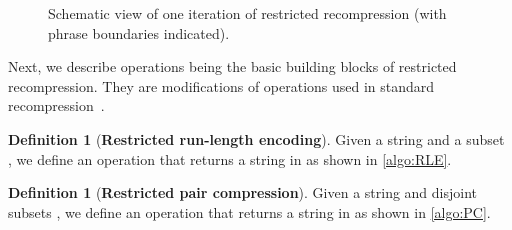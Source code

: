 \documentclass[a4paper]{article}
\theoremstyle{definition}
\newtheorem{definition}[theorem]{Definition}
\theoremstyle{remark}
\begin{document}
\begin{figure}[h]
   \caption{
  Schematic view of one iteration of restricted recompression
  (with phrase boundaries indicated).}\label{fig:schematic}
\end{figure}

Next, we describe operations being the basic building blocks of restricted recompression.
They are modifications of operations used in standard recompression~\cite{DBLP:journals/jacm/Jez16}.

\begin{definition}[{\bf Restricted run-length encoding}]\label{it:rle}Given a string  and a subset , we define an operation  that returns a string in  as shown in \cref{algo:RLE}.

\begin{minipage}[t]{.93\textwidth}\vspace{0pt}
\begin{algorithm}[H]
\Return{}\;
\caption{}\label{algo:RLE}
\end{algorithm}
\end{minipage}
\end{definition}

\begin{definition}[{\bf Restricted pair compression}]\label{it:pair}
Given a string  and disjoint subsets , we define an operation
 that returns a string in  as shown in \cref{algo:PC}.

\begin{minipage}[t]{.93\textwidth}\vspace{0pt}
\begin{algorithm}[H]
\Return{}\;
\caption{}\label{algo:PC}
\end{algorithm}
\end{minipage}
\end{definition}
\end{document}
